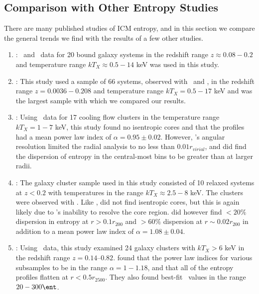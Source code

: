 \documentclass{emulateapj}
\begin{document}
\subsection{Comparison with Other Entropy Studies}
\label{sec:comp}

There are many published studies of ICM entropy, and in this section
we compare the general trends we find with the results of a few other
studies.
\begin{enumerate}
\item \citet{davies00}: \rosat\ and \asca\ data for 20 bound galaxy
  systems in the redshift range $z \approx 0.08-0.2$ and temperature
  range $kT_X \approx 0.5-14$ keV was used in this study.
\item \citet{ponman03}: This study used a sample of 66 systems,
  observed with \rosat\ and \asca, in the redshift range $z=
  0.0036-0.208$ and temperature range $kT_X = 0.5-17$ keV and was the
  largest sample with which we compared our results.
\item \citet{piffaretti05}: Using \xmm\ data for 17 cooling flow
  clusters in the temperature range $kT_X = 1-7$ keV, this study found
  no isentropic cores and that the profiles had a mean power law index
  of $\alpha = 0.95 \pm 0.02$. However, \xmm's angular resolution
  limited the radial analysis to no less than $0.01 r_{virial}$, and
  \citet{piffaretti05} did find the dispersion of entropy in the
  central-most bins to be greater than at larger radii.
\item \citet{pratt06}: The galaxy cluster sample used in this study
  consisted of 10 relaxed systems at $z < 0.2$ with temperatures in
  the range $kT_X \approx 2.5-8$ keV. The clusters were observed with
  \xmm. Like \citet{piffaretti05}, \citet{pratt06} did not find
  isentropic cores, but this is again likely due to \xmm's inability
  to resolve the core region. \citet{pratt06} did however find $<
  20\%$ dispersion in entropy at $r > 0.1r_{200}$ and $> 60\%$
  dispersion at $r \sim 0.02r_{200}$ in addition to a mean power law
  index of $\alpha = 1.08 \pm 0.04$.
\item \citet{morandi07}: Using \chandra\ data, this study examined 24
  galaxy clusters with $kT_X > 6$ keV in the redshift range
  $z=0.14–0.82$. \citet{morandi07} found that the power law indices
  for various subsamples to be in the range $\alpha=1-1.18$, and that
  all of the entropy profiles flatten at $r < 0.5r_{2500}$. They also
  found best-fit \kna\ values in the range $20-300 \ent$.
\end{enumerate}
\end{document}
